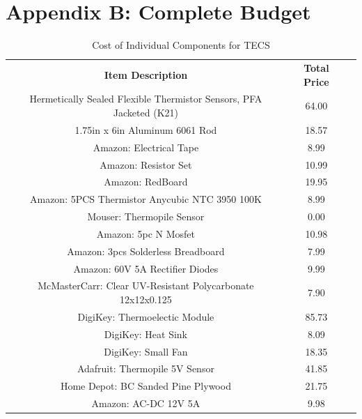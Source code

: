 \documentclass[12pt]{article}
\begin{document}
\section{Appendix B: Complete Budget}
\begin{table}[B]
\centering
\caption{Cost of Individual Components for TECS}
\label{my-label}
\begin{tabular}{ccc} 
\textbf{Item Description}                                                    & \textbf{Total Price} \\ 
Hermetically Sealed Flexible Thermistor Sensors, PFA Jacketed (K21) & 64.00       \\
1.75in x 6in Aluminum  6061 Rod                                     & 18.57       \\
Amazon: Electrical Tape                                             & 8.99        \\
Amazon: Resistor Set                                                & 10.99       \\
Amazon: RedBoard                                                    & 19.95       \\
Amazon: 5PCS Thermistor Anycubic NTC 3950 100K                      & 8.99        \\
Mouser: Thermopile Sensor                                           & 0.00        \\
Amazon: 5pc N Mosfet                                                & 10.98       \\
Amazon: 3pcs Solderless Breadboard                                  & 7.99        \\
Amazon: 60V 5A Rectifier Diodes                                     & 9.99        \\
McMasterCarr: Clear UV-Resistant Polycarbonate 12x12x0.125          & 7.90        \\
DigiKey: Thermoelectic Module                                       & 85.73       \\
DigiKey: Heat Sink                                                  & 8.09        \\
DigiKey: Small Fan                                                  & 18.35       \\
Adafruit: Thermopile 5V Sensor                                      & 41.85       \\
Home Depot: BC Sanded Pine Plywood                                  & 21.75       \\
Amazon: AC-DC 12V 5A                                                & 9.98        \\

\end{tabular}
\end{table}
\end{document}
